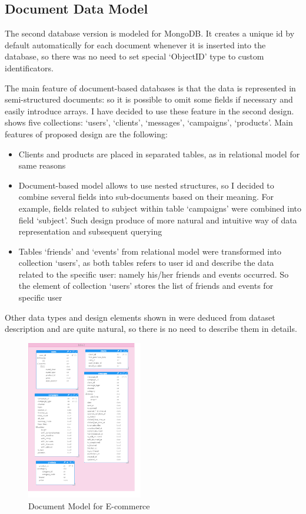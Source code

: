 \documentclass[conference]{IEEEtran}
\begin{document}
\subsection{Document Data Model}
The second database version is modeled for MongoDB.  It creates a unique id by default automatically for each document whenever it is inserted into the database, so there was no need to set special `ObjectID' type to custom identificators.

The main feature of document-based databases is that the data is represented in semi-structured documents: so it is possible to omit some fields if necessary and easily introduce arrays. I have decided to use these feature in the second design.  shows five collections: `users', `clients', `messages', `campaigns', `products'. Main features of proposed design are the following:
\begin{itemize}
    \item Clients and products are placed in separated tables, as in relational model for same reasons
    \item Document-based model allows to use nested structures, so I decided to combine several fields into sub-documents based on their meaning. For example, fields related to subject within table `campaigns' were combined into field `subject'. Such design produce of more natural and intuitive way of data representation and subsequent querying
    \item Tables `friends' and `events' from relational model were transformed into collection `users', as both tables refers to user id and describe the data related to the specific user: namely his/her friends and events occurred. So the element of collection `users' stores the list of friends and events for specific user
\end{itemize}
Other data types and design elements shown in  were deduced from dataset description and are quite natural, so there is no need to describe them in details.

\begin{figure}[htbp]
    \centerline{\includegraphics[width=0.45\textwidth]{../screenshots/MongoDBModel.png}}
    \caption{Document Model for E-commerce}\label{fig:mongo_model}
\end{figure}
\end{document}
